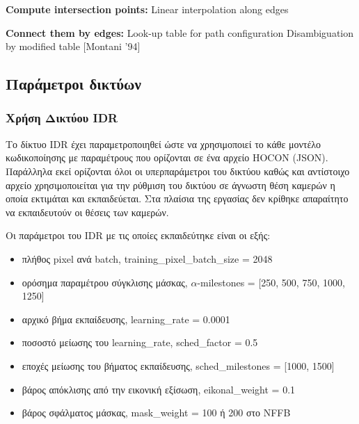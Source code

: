 \begin{appendices}
\begin{algorithm}[H]
\begin{algorithmic}
            \State \textbf{Compute intersection points:}
            \State Linear interpolation along edges
            \EndFor
            
            
            \State \textbf{Connect them by edges:}
            \State Look-up table for path configuration
            \State Disambiguation by modified table [Montani '94]
            \end{algorithmic}
            \end{algorithm} 
            


\subsection*{Παράμετροι δικτύων}
    \subsubsection{Χρήση Δικτύου IDR}
    Το δίκτυο IDR\cite{yariv2020multiview} έχει παραμετροποιηθεί ώστε να χρησιμοποιεί το κάθε μοντέλο κωδικοποίησης με παραμέτρους που ορίζονται σε ένα αρχείο HOCON (JSON). Παράλληλα εκεί ορίζονται όλοι οι υπερπαράμετροι του δικτύου καθώς και αντίστοιχο αρχείο χρησιμοποιείται για την ρύθμιση του δικτύου σε άγνωστη θέση καμερών η οποία εκτιμάται και εκπαιδεύεται. Στα πλαίσια της εργασίας δεν κρίθηκε απαραίτητο να εκπαιδευτούν οι θέσεις των καμερών.

    Οι παράμετροι του IDR με τις οποίες εκπαιδεύτηκε είναι οι εξής:
       
        \begin{itemize}
            \item πλήθος pixel ανά batch, training\_pixel\_batch\_size = 2048
            \item ορόσημα παραμέτρου σύγκλισης μάσκας, $\alpha$-milestones = [250, 500, 750, 1000, 1250]
            \item αρχικό βήμα εκπαίδευσης, learning\_rate = 0.0001
            \item ποσοστό μείωσης του learning\_rate, sched\_factor = 0.5
            \item εποχές μείωσης του βήματος εκπαίδευσης, sched\_milestones = [1000, 1500]
            \item βάρος απόκλισης από την εικονική εξίσωση, eikonal\_weight = 0.1
            \item βάρος σφάλματος μάσκας, mask\_weight = 100 ή 200 στο NFFB
        \end{itemize}


\end{appendices}
